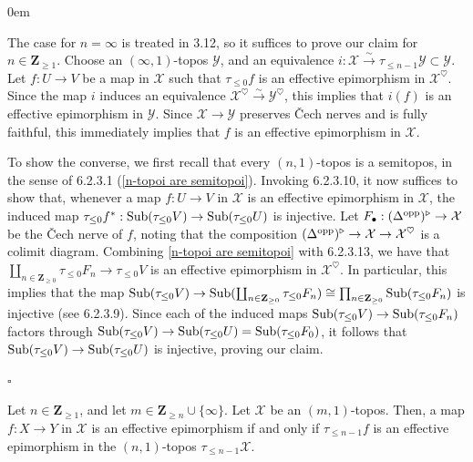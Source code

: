 \documentclass[10pt]{article}
\newcommand{\cX}{\mathcal{X}}
\newcommand{\cY}{\mathcal{Y}}
\newcommand{\ZZ}{\mathbb{Z}}
\def\ZZ{{\mathbf Z}}
\renewcommand{\qed}{\hfill$\square$}
\renewenvironment{proof}{\begin{addmargin}[1em]{0em}\begin{newproof}}{\end{newproof}\end{addmargin}\qed}
\theoremstyle{witharg}
\theoremstyle{witharg}
\theoremstyle{witharg2}
\begin{document}
\begin{proof}

    The case for $n=\infty$ is treated in  3.12, so it suffices to prove our claim for $n\in \ZZ_{\geq 1}$. Choose an $(\infty,1)$-topos $\cY$, and an equivalence $i:\cX\xrightarrow{\sim}\tau_{\leq n-1}\cY\subset \cY$. Let $f:U\rightarrow V$ be a map in $\cX$ such that $\tau_{\leq 0}f$ is an effective epimorphism in $\cX^\heartsuit$. Since the map $i$ induces an equivalence $\cX^\heartsuit\xrightarrow{\sim}\cY^\heartsuit$, this implies that $i(f)$ is an effective epimorphism in $\cY$. Since $\cX\rightarrow \cY$ preserves \v{C}ech nerves and is fully faithful, this immediately implies that $f$ is an effective epimorphism in $\cX$. 

    To show the converse, we first recall that every $(n,1)$-topos is a semitopos, in the sense of  6.2.3.1 (\ref{n-topoi are semitopoi}). Invoking  6.2.3.10, it now suffices to show that, whenever a map $f:U\rightarrow V$ in $\cX$ is an effective epimorphism in $\cX$, the induced map $\tau_{\leq 0}f^*:\textnormal{Sub}(\tau_{\leq 0}V)\rightarrow \textnormal{Sub}(\tau_{\leq 0}U)$ is injective. Let $F_\bullet:(\Delta^{\textnormal{opp}})^\triangleright\rightarrow \cX$ be the \v{C}ech nerve of $f$, noting that the composition $(\Delta^{\textnormal{opp}})^\triangleright\rightarrow \cX\rightarrow \cX^\heartsuit$ is a colimit diagram. Combining \ref{n-topoi are semitopoi} with  6.2.3.13, we have that $\coprod_{n\in \ZZ_{\geq 0}}\tau_{\leq 0}F_n\rightarrow \tau_{\leq 0}V$ is an effective epimorphism in $\cX^\heartsuit$. In particular, this implies that the map $\textnormal{Sub}(\tau_{\leq 0}V)\rightarrow \textnormal{Sub}(\coprod_{n\in \ZZ_{\geq 0}}\tau_{\leq 0}F_n)\cong \prod_{n\in \ZZ_{\geq 0}}\textnormal{Sub}(\tau_{\leq 0}F_n)$ is injective (see  6.2.3.9). Since each of the induced maps $\textnormal{Sub}(\tau_{\leq 0}V)\rightarrow \textnormal{Sub}(\tau_{\leq 0}F_n)$ factors through $\textnormal{Sub}(\tau_{\leq 0}V)\rightarrow \textnormal{Sub}(\tau_{\leq 0}U)=\textnormal{Sub}(\tau_{\leq 0}F_0)$, it follows that $\textnormal{Sub}(\tau_{\leq 0}V)\rightarrow \textnormal{Sub}(\tau_{\leq 0}U)$ is injective, proving our claim. 

\end{proof}

\begin{corollary}{}\label{preservation of effective epimorphisms in truncations}
    Let $n\in \ZZ_{\geq 1}$, and let $m\in \ZZ_{\geq n}\cup \{\infty\}$. Let $\cX$ be an $(m,1)$-topos. Then, a map $f:X\rightarrow Y$ in $\cX$ is an effective epimorphism if and only if $\tau_{\leq n-1}f$ is an effective epimorphism in the $(n,1)$-topos $\tau_{\leq n-1}\cX$.
    
\end{corollary}
\end{document}
